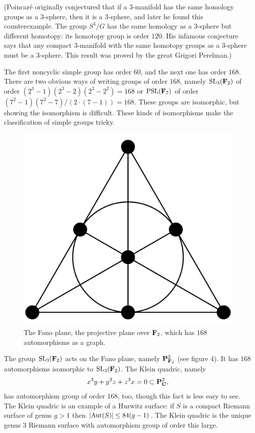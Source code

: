 \documentclass[11pt, twoside]{amsart}
\begin{document}
(Poincar\'e originally conjectured that if a $3$-manifold has the same homology groups as a $3$-sphere, then it is a $3$-sphere, and later he found this counterexample. The group $S^3/G$ has the same homology as a $3$-sphere but different homotopy: its homotopy group is order $120$. His infamous conjecture says that any compact $3$-manifold with the same homotopy groups as a $3$-sphere must be a $3$-sphere. This result was proved by the great Grigori Perelman.)

The first noncyclic simple group has order $60$, and the next one has order $168$. There are two obvious ways of writing groups of order $168$, namely $\operatorname{SL}_3(\mathbf F_2)$ of order $(2^3-1)(2^3 - 2)(2^3 - 2^2) = 168$ or $\operatorname{PSL}(\mathbf F_7)$ of order $(7^2 - 1)(7^2-7)/(2\cdot(7-1)) =168$. These groups are isomorphic, but showing the isomorphism is difficult. These kinds of isomorphisms make the classification of simple groups tricky.
\begin{figure}
\centering
\includegraphics[scale=0.1]{images/fano_plane}
\caption{The Fano plane, the projective plane over $\mathbf F_2$, which has $168$ automorphisms as a graph.}
\end{figure}
The group $\operatorname{SL}_3(\mathbf F_2)$ acts on the Fano plane, namely $\mathbf P^2_{\mathbf F_2}$ (see figure 4). It has $168$ automorphisms isomorphic to $\operatorname{SL}_3(\mathbf F_2)$. The Klein quadric, namely 
$$
x^3y + y^3z + z^3x = 0\subset \mathbf P^2_\mathbf C,
$$
has automorphism group of order $168$, too, though this fact is less easy to see. The Klein quadric is an example of a Hurwitz surface: if $S$ is a compact Riemann surface of genus $g> 1$ then $\left \lvert \operatorname{Aut} (S) \right \rvert \le  84(g-1)$. The Klein quadric is the unique genus $3$ Riemann surface with automorphism group of order this large.
\end{document}

